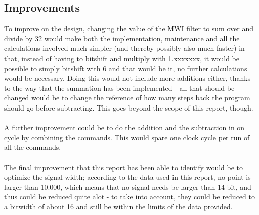 \documentclass[12pt,a4paper]{article}
\begin{document}
\subsection{Improvements}
To improve on the design, changing the value of the MWI filter to sum over and divide by 32 would make both the implementation, maintenance and all the calculations involved much simpler (and thereby possibly also much faster) in that, instead of having to bitshift and multiply with 1.xxxxxxx, it would be possible to simply bitshift with 6 and that would be it, no further calculations would be necessary. Doing this would not include more additions either, thanks to the way that the summation has been implemented - all that should be changed would be to change the reference of how many steps back the program should go before subtracting. This goes beyond the scope of this report, though.\\
\\
A further improvement could be to do the addition and the subtraction in on cycle by combining the commands. This would spare one clock cycle per run of all the commands.\\
\\
The final improvement that this report has been able to identify would be to optimize the signal width; according to the data used in this report, no point is larger than 10.000, which means that no signal needs be larger than 14 bit, and thus could be reduced quite alot - to take into account, they could be reduced to a bitwidth of about 16 and still be within the limits of the data provided.\\
\end{document}
